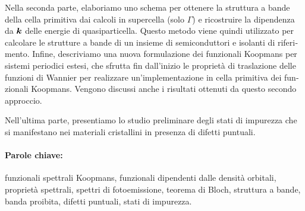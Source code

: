 \begin{otherlanguage}{italian}
Nella seconda parte, elaboriamo uno schema per ottenere la struttura a bande della cella primitiva dai calcoli in supercella (solo $\Gamma$) e ricostruire la dipendenza da ${\bm k}$ delle energie di quasiparticella. Questo metodo viene quindi utilizzato per calcolare le strutture a bande di un insieme di semiconduttori e isolanti di riferimento. Infine, descriviamo una nuova formulazione dei funzionali Koopmans per sistemi periodici estesi, che sfrutta fin dall'inizio le propriet\`{a} di traslazione delle funzioni di Wannier per realizzare un'implementazione in cella primitiva dei funzionali Koopmans. Vengono discussi anche i risultati ottenuti da questo secondo approccio.

Nell'ultima parte, presentiamo lo studio preliminare degli stati di impurezza che si manifestano nei materiali cristallini in presenza di difetti puntuali.

%
\paragraph{Parole chiave:}
funzionali spettrali Koopmans,
funzionali dipendenti dalle densit\`{a} orbitali,
propriet\`{a} spettrali,
spettri di fotoemissione,
teorema di Bloch,
struttura a bande,
banda proibita,
difetti puntuali,
stati di impurezza.
%
\end{otherlanguage}

\endgroup			
\vfill
